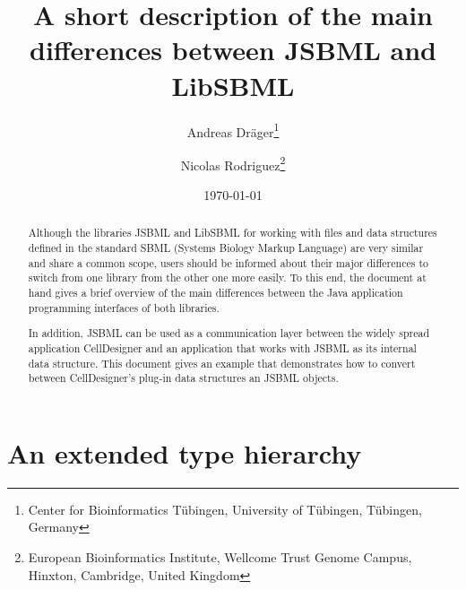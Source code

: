 \documentclass[
  BCOR12mm,
  letterpaper,
  11pt,
  headsepline,
  pointlessnumbers,
  tablecaptionabove,
  headinclude,
  appendixprefix,
  idxtotoc,
  bibtotoc,
  twoside,
  titlepage
]{scrartcl}
\title{A short description of the main differences between JSBML and LibSBML}
\author{Andreas Dr\"ager\thanks{Center for Bioinformatics T\"ubingen, University
of T\"ubingen, T\"ubingen, Germany}\and%
Nicolas Rodriguez\thanks{European Bioinformatics Institute, Wellcome Trust
Genome Campus, Hinxton, Cambridge, United Kingdom}}
\date{\today}
\begin{document}
\maketitle
\tableofcontents

\begin{abstract}
Although the libraries JSBML and LibSBML for working with files and data
structures defined in the standard SBML (Systems Biology Markup Language) are
very similar and share a common scope, users should be informed about their
major differences to switch from one library from the other one more easily. To
this end, the document at hand gives a brief overview of the main differences
between the Java\texttrademark{} application programming interfaces of both
libraries.

In addition, JSBML can be used as a communication layer between the widely
spread application CellDesigner and an application that works with JSBML as its
internal data structure. This document gives an example that demonstrates how to
convert between CellDesigner's plug-in data structures an JSBML objects.
\end{abstract}

\section{An extended type hierarchy}
\end{document}
